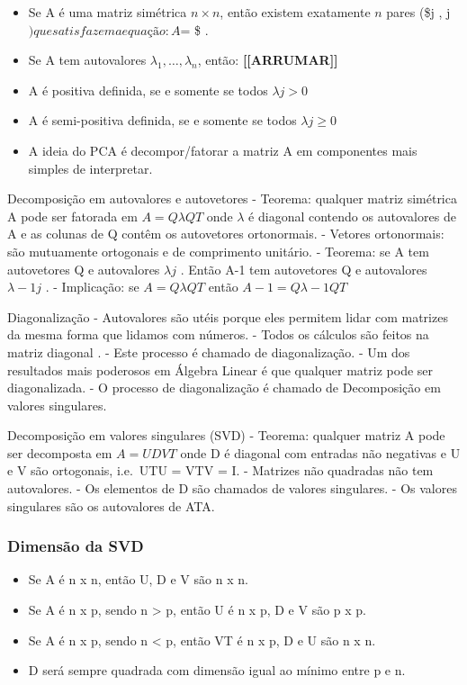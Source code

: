 \documentclass[
]{article}
\providecommand{\tightlist}{%
  \setlength{\itemsep}{0pt}\setlength{\parskip}{0pt}}
\begin{document}
\begin{itemize}
\item
  Se A é uma matriz simétrica \(n \times n\), então existem exatamente
  \(n\) pares (\$\lambda j , \upsilon j
  \() que satisfazem a equação: A\)\upsilon  = \lambda \upsilon\$ .
\item
  Se A tem autovalores \(\lambda_1, … , \lambda_n\), então:
  \textbf{{[}{[}ARRUMAR{]}{]}}
\item
  A é positiva definida, se e somente se todos \(\lambda j > 0\)
\item
  A é semi-positiva definida, se e somente se todos \(\lambda j ≥ 0\)
\item
  A ideia do PCA é decompor/fatorar a matriz A em componentes mais
  simples de interpretar.
\end{itemize}

Decomposição em autovalores e autovetores - Teorema: qualquer matriz
simétrica A pode ser fatorada em \(A = Q\lambda QT\) onde \(\lambda\) é
diagonal contendo os autovalores de A e as colunas de Q contêm os
autovetores ortonormais. - Vetores ortonormais: são mutuamente
ortogonais e de comprimento unitário. - Teorema: se A tem autovetores Q
e autovalores \(\lambda j\) . Então A-1 tem autovetores Q e autovalores
\(\lambda -1 j\) . - Implicação: se \(A = Q\lambda QT\) então
\(A-1 = Q\lambda -1QT\)

Diagonalização - Autovalores são utéis porque eles permitem lidar com
matrizes da mesma forma que lidamos com números. - Todos os cálculos são
feitos na matriz diagonal \lambda . - Este processo é chamado de
diagonalização. - Um dos resultados mais poderosos em Álgebra Linear é
que qualquer matriz pode ser diagonalizada. - O processo de
diagonalização é chamado de Decomposição em valores singulares.

Decomposição em valores singulares (SVD) - Teorema: qualquer matriz A
pode ser decomposta em \(A = UDVT\) onde D é diagonal com entradas não
negativas e U e V são ortogonais, i.e.~UTU = VTV = I. - Matrizes não
quadradas não tem autovalores. - Os elementos de D são chamados de
valores singulares. - Os valores singulares são os autovalores de ATA.

\hypertarget{dimensuxe3o-da-svd}{%
\subsubsection{Dimensão da SVD}\label{dimensuxe3o-da-svd}}

\begin{itemize}
\tightlist
\item
  Se A é n x n, então U, D e V são n x n.
\item
  Se A é n x p, sendo n \textgreater{} p, então U é n x p, D e V são p x
  p.
\item
  Se A é n x p, sendo n \textless{} p, então VT é n x p, D e U são n x
  n.
\item
  D será sempre quadrada com dimensão igual ao mínimo entre p e n.
\end{itemize}
\end{document}
